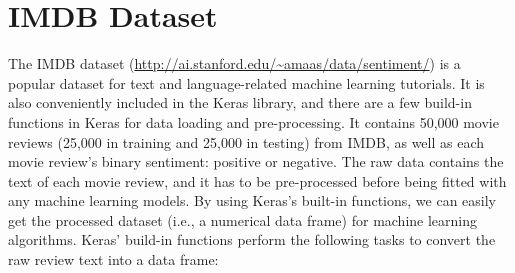 \documentclass[12pt,]{krantz}
\begin{document}
\hypertarget{imdb-dataset}{%
\section{IMDB Dataset}\label{imdb-dataset}}

The IMDB dataset (\url{http://ai.stanford.edu/~amaas/data/sentiment/}) is a popular dataset for text and language-related machine learning tutorials. It is also conveniently included in the Keras library, and there are a few build-in functions in Keras for data loading and pre-processing. It contains 50,000 movie reviews (25,000 in training and 25,000 in testing) from IMDB, as well as each movie review's binary sentiment: positive or negative. The raw data contains the text of each movie review, and it has to be pre-processed before being fitted with any machine learning models. By using Keras's built-in functions, we can easily get the processed dataset (i.e., a numerical data frame) for machine learning algorithms. Keras' build-in functions perform the following tasks to convert the raw review text into a data frame:
\end{document}
